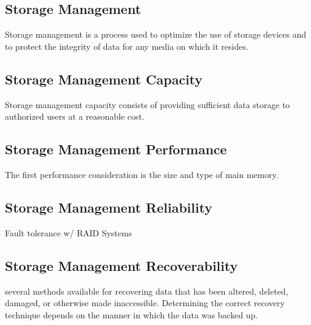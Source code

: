 \documentclass[8pt,a4]{extarticle}
\begin{document}
\begin{multicols}{3}
\section{Storage Management}
Storage management is a process used to optimize the use of storage devices and to protect the integrity of data 
for any media on which it resides.

\subsection{Storage Management Capacity}
Storage management capacity consists of providing sufficient data storage to authorized users at a reasonable cost.

\subsection{Storage Management Performance}
The first performance consideration is the size and type of main memory.

\subsection{Storage Management Reliability}
Fault tolerance w/ RAID Systems


\subsection{Storage Management Recoverability}
several methods available for recovering data that has been altered, deleted, damaged, or otherwise made inaccessible.
Determining the correct recovery technique depends on the manner in which the data was backed up.


\end{multicols}
\end{document}
